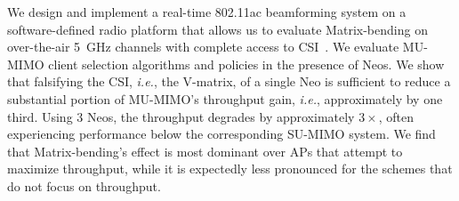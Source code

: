 We design and implement a real-time 802.11ac beamforming system on a software-defined radio 
platform that allows us to evaluate Matrix-bending on over-the-air 5~GHz channels with complete access to CSI~\cite{warpProject}. We evaluate MU-MIMO client selection 
algorithms and policies in the presence of Neos. We show that falsifying the CSI, \emph{i.e.}, the V-matrix, of a single Neo is sufficient to reduce a substantial portion of MU-MIMO's throughput gain, \emph{i.e.}, approximately by one third. Using $3$ Neos, the throughput degrades by approximately $3\times$, often experiencing performance below
the corresponding SU-MIMO system. We find that Matrix-bending's effect is most dominant over APs that attempt to maximize throughput,  while it is expectedly less pronounced for the schemes that do not focus on throughput.

